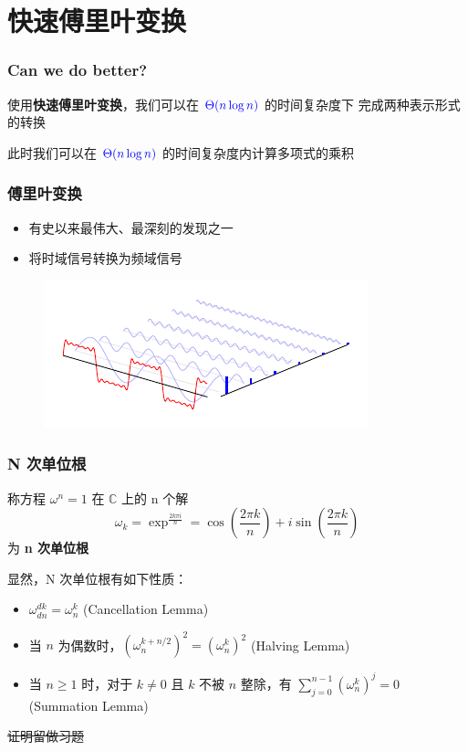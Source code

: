 \documentclass[UTF8]{ctexbeamer}
\begin{document}
\section{快速傅里叶变换}

\begin{frame}
    \frametitle{Can we do better?}
    使用\textbf{快速傅里叶变换}，我们可以在
    $\textcolor{blue}{\Theta(n \log n)}$ 的时间复杂度下
    完成两种表示形式的转换
 
    此时我们可以在 $\textcolor{blue}{\Theta(n \log n)}$
    的时间复杂度内计算多项式的乘积
\end{frame}

\begin{frame}
    \frametitle{傅里叶变换}
    \begin{itemize}
        \item 有史以来最伟大、最深刻的发现之一
        \item 将时域信号转换为频域信号
    \end{itemize}
    \begin{figure}
        \includegraphics[width= 0.8\linewidth]{ft.pdf}
     \end{figure}
\end{frame}

\begin{frame}
    \frametitle{N 次单位根}
    \begin{block}{}
        称方程 $\omega^n = 1$ 在 $\mathbb{C}$ 上的 n 个解
        $$\omega_k = \exp^{\frac{2k\pi i}{n}} = \cos(\frac{2\pi k}{n}) + i \sin(\frac{2\pi k}{n})$$
        为 \textbf{n 次单位根}
    \end{block}
    显然，N 次单位根有如下性质：
    \begin{itemize}
        \item $\omega_{dn}^{dk} = \omega_{n}^{k}$ (Cancellation Lemma)
        \item 当 $n$ 为偶数时，$(\omega_n^{k + n/2})^2 = (\omega_n^k)^2$ (Halving Lemma)
        \item 当 $n \geq 1$ 时，对于 $k \neq 0$ 且 $k$ 不被 $n$ 整除，有 
        $\sum_{j = 0}^{n - 1} (\omega_n^k)^j = 0$ (Summation Lemma)
    \end{itemize}
    \begin{center}
        \sout{证明留做习题}
    \end{center}
\end{frame}
\end{document}
